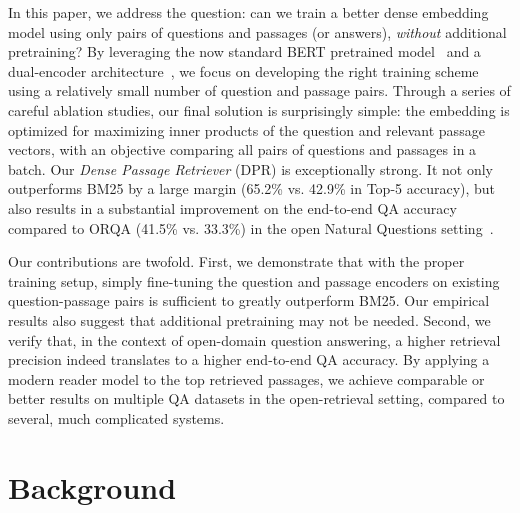 \documentclass[11pt,a4paper]{article}
\begin{document}
In this paper, we address the question: can we train a better dense embedding model using only pairs of questions and passages (or answers), \emph{without} additional pretraining?
By leveraging the now standard BERT pretrained model~\cite{devlin2018bert} and a dual-encoder architecture~\cite{bromley1994signature}, we focus on developing the right training scheme using a relatively small number of question and passage pairs. Through a series of careful ablation studies, our final solution is surprisingly simple: the embedding is optimized for maximizing inner products of the question and relevant passage vectors, with an objective comparing all pairs of questions and passages in a batch.
Our \emph{Dense Passage Retriever} (DPR) is exceptionally strong. It not only outperforms BM25 by a large margin (65.2\% vs. 42.9\% in Top-5 accuracy), but also results in a substantial improvement on the end-to-end QA accuracy compared to ORQA (41.5\% vs. 33.3\%) in the open Natural Questions setting~\cite{lee2019latent,kwiatkowski2019natural}.


Our contributions are twofold.
First, we demonstrate that with the proper training setup, simply fine-tuning the question and passage encoders on existing question-passage pairs
is sufficient to greatly outperform BM25.
Our empirical results also suggest that additional pretraining may not be needed.
Second, we verify that, in the context of open-domain question answering, a higher retrieval precision indeed translates to a higher end-to-end QA accuracy.
By applying a modern reader model to the top retrieved passages, we achieve comparable or better results on multiple QA datasets in the open-retrieval setting,
compared to several, much complicated systems.


 
\section{Background}
\label{sec:background}
\end{document}
